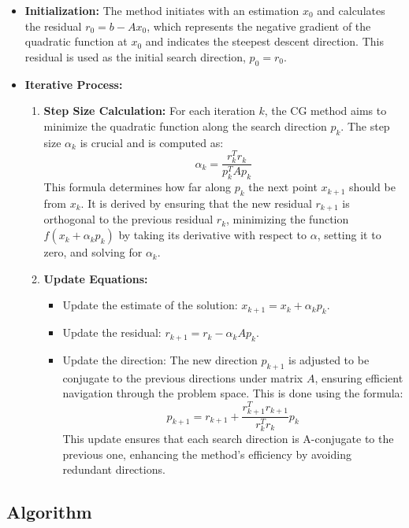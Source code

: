 \documentclass[11pt]{article}
\begin{document}
\begin{itemize}
    \item \textbf{Initialization:} The method initiates with an estimation \( x_0 \) and calculates the residual \( r_0 = b - Ax_0 \), which represents the negative gradient of the quadratic function at \( x_0 \) and indicates the steepest descent direction. This residual is used as the initial search direction, \( p_0 = r_0 \).

    \item \textbf{Iterative Process:} 
        \begin{enumerate}
            \item \textbf{Step Size Calculation:} For each iteration \( k \), the CG method aims to minimize the quadratic function along the search direction \( p_k \). The step size \( \alpha_k \) is crucial and is computed as:
            \[
            \alpha_k = \frac{r_k^T r_k}{p_k^T A p_k}
            \]
            This formula determines how far along \( p_k \) the next point \( x_{k+1} \) should be from \( x_k \). It is derived by ensuring that the new residual \( r_{k+1} \) is orthogonal to the previous residual \( r_k \), minimizing the function \( f(x_k + \alpha_k p_k) \) by taking its derivative with respect to \( \alpha \), setting it to zero, and solving for \( \alpha_k \).

            \item \textbf{Update Equations:} 
            \begin{itemize}
                \item Update the estimate of the solution: \( x_{k+1} = x_k + \alpha_k p_k \).
                \item Update the residual: \( r_{k+1} = r_k - \alpha_k A p_k \).
                \item Update the direction: The new direction \( p_{k+1} \) is adjusted to be conjugate to the previous directions under matrix \( A \), ensuring efficient navigation through the problem space. This is done using the formula:
                \[
                p_{k+1} = r_{k+1} + \frac{r_{k+1}^T r_{k+1}}{r_k^T r_k} p_k
                \]
                This update ensures that each search direction is A-conjugate to the previous one, enhancing the method's efficiency by avoiding redundant directions.
            \end{itemize}
        \end{enumerate}
\end{itemize}

\subsection{Algorithm}
\end{document}
